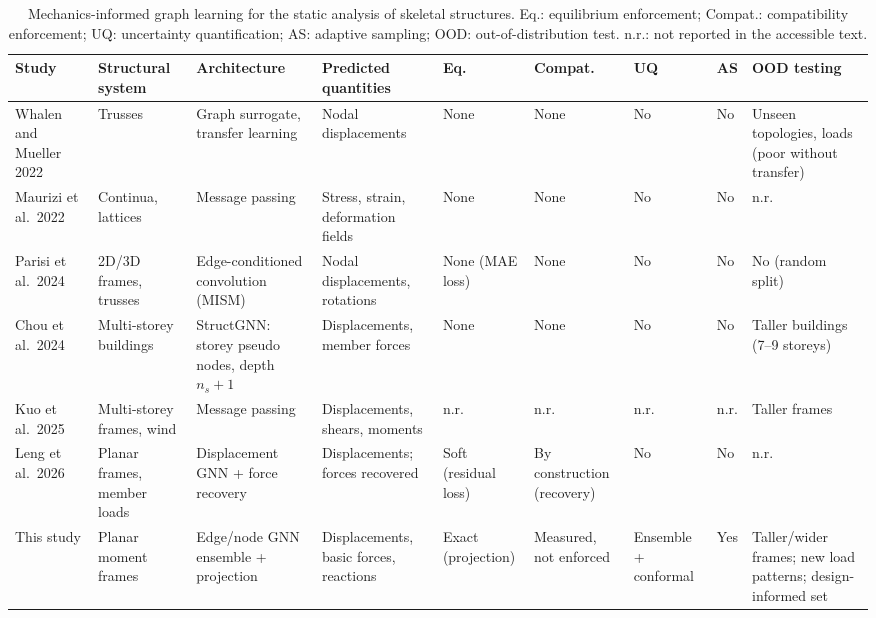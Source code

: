 \begin{table}[t]
\centering
\caption{Mechanics-informed graph learning for the static analysis of skeletal structures. Eq.: equilibrium enforcement; Compat.: compatibility enforcement; UQ: uncertainty quantification; AS: adaptive sampling; OOD: out-of-distribution test. n.r.: not reported in the accessible text.}\label{tab:review}
\footnotesize
\begin{adjustbox}{max width=\textwidth}
\begin{tabular}{p{2.3cm}p{2.3cm}p{2.6cm}p{2.4cm}p{1.9cm}p{1.9cm}p{1.2cm}p{1.1cm}p{2.3cm}}
\toprule
Study & Structural system & Architecture & Predicted quantities & Eq. & Compat. & UQ & AS & OOD testing \\
\midrule
Whalen and Mueller 2022~\cite{whalen2022truss} & Trusses & Graph surrogate, transfer learning & Nodal displacements & None & None & No & No & Unseen topologies, loads (poor without transfer) \\
Maurizi et al.\ 2022~\cite{maurizi2022gnn} & Continua, lattices & Message passing & Stress, strain, deformation fields & None & None & No & No & n.r. \\
Parisi et al.\ 2024~\cite{parisi2024mism} & 2D/3D frames, trusses & Edge-conditioned convolution (MISM) & Nodal displacements, rotations & None (MAE loss) & None & No & No & No (random split) \\
Chou et al.\ 2024~\cite{chou2024structgnn} & Multi-storey buildings & StructGNN: storey pseudo nodes, depth $n_s+1$ & Displacements, member forces & None & None & No & No & Taller buildings (7--9 storeys) \\
Kuo et al.\ 2025~\cite{kuo2025gnn} & Multi-storey frames, wind & Message passing & Displacements, shears, moments & n.r. & n.r. & n.r. & n.r. & Taller frames \\
Leng et al.\ 2026~\cite{leng2026mcgnn} & Planar frames, member loads & Displacement GNN + force recovery & Displacements; forces recovered & Soft (residual loss) & By construction (recovery) & No & No & n.r. \\
This study & Planar moment frames & Edge/node GNN ensemble + projection & Displacements, basic forces, reactions & Exact (projection) & Measured, not enforced & Ensemble + conformal & Yes & Taller/wider frames; new load patterns; design-informed set \\
\bottomrule
\end{tabular}
\end{adjustbox}
\end{table}


